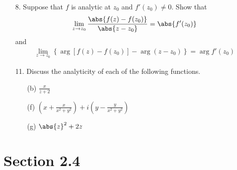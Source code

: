 \documentclass{article}
\begin{document}
\begin{itemize}
	\item[8.] Suppose that $f$ is analytic at $z_0$ and $f'(z_0)\neq 0.$ Show that
		\begin{align*}
			\lim_{z\to z_0} \frac{\abs{f(z)-f(z_0)}}{\abs{z-z_0}} = \abs{f'(z_0)}
		\end{align*}
		and
		\begin{align*}
			\lim_{z\to z_0} \left\{ \arg\left[ f(z)-f(z_0) \right]-\arg(z-z_0) \right\} = \arg f'(z_0)
		\end{align*}

	\item[11.] Discuss the analyticity of each of the following functions.
		\begin{itemize}
			\item[(b)] $\frac{x}{\overline z+2}$

			\item[(f)] $\left( x+\frac{x}{x^2+y^2} \right)+i\left( y-\frac{y}{x^2+y^2} \right)$

			\item[(g)] $\abs{z}^2+2z$
				
		\end{itemize}
		
\end{itemize}

\section*{Section 2.4}
\end{document}
